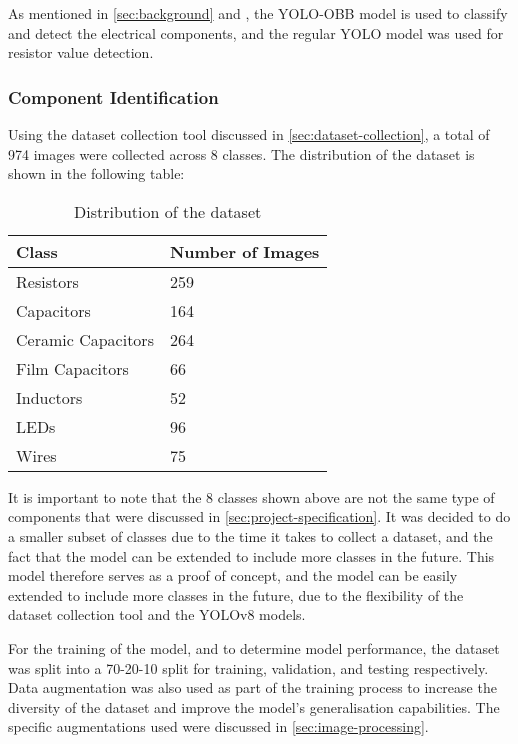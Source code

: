 
As mentioned in \autoref{sec:background} and \label{sec:computer-vision-system}, the YOLO-OBB model \cite{yolov8} is used to classify and detect the electrical components, and the regular YOLO model was used for resistor value detection.

\subsubsection{Component Identification}
Using the dataset collection tool discussed in \autoref{sec:dataset-collection}, a total of 974 images were collected across 8 classes. The distribution of the dataset is shown in the following table:
\begin{table}[H]
  \centering
  \begin{tabularx}{0.5\textwidth}{|X|X|}
    \hline
    \textbf{Class} & \textbf{Number of Images} \\
    \hline
    Resistors & 259 \\
    \hline
    Capacitors & 164 \\
    \hline
    Ceramic Capacitors & 264 \\
    \hline
    Film Capacitors & 66 \\
    \hline
    Inductors & 52 \\
    \hline
    LEDs & 96 \\
    \hline
    Wires & 75 \\
    \hline
  \end{tabularx}
  \caption{Distribution of the dataset}
  \label{tab:dataset-distribution}
\end{table}

It is important to note that the 8 classes shown above are not the same type of components that were discussed in \autoref{sec:project-specification}. It was decided to do a smaller subset of classes due to the time it takes to collect a dataset, and the fact that the model can be extended to include more classes in the future. This model therefore serves as a proof of concept, and the model can be easily extended to include more classes in the future, due to the flexibility of the dataset collection tool and the YOLOv8 models.


For the training of the model, and to determine model performance, the dataset was split into a 70-20-10 split for training, validation, and testing respectively. Data augmentation was also used as part of the training process to increase the diversity of the dataset and improve the model's generalisation capabilities. The specific augmentations used were discussed in \autoref{sec:image-processing}. 

